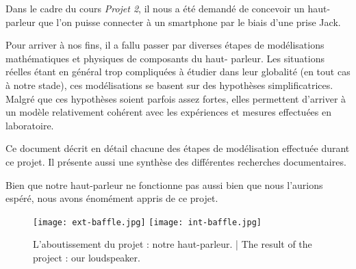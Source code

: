 

\begin{abstract-fr}
Dans le cadre du cours \textit{Projet 2}, il nous a été demandé
de concevoir un haut-parleur que l'on puisse connecter à un smartphone
par le biais d'une prise Jack.

Pour arriver à nos fins, il a fallu passer par diverses étapes
de modélisations mathématiques et physiques de composants du haut-
parleur. Les situations réelles étant en général trop compliquées à étudier
dans leur globalité (en tout cas à notre stade), ces modélisations se basent sur des 
hypothèses simplificatrices. Malgré que ces hypothèses soient parfois assez fortes, 
elles permettent d'arriver à un modèle relativement cohérent avec les expériences et
mesures effectuées en laboratoire.

Ce document décrit en détail chacune des étapes de modélisation effectuée durant
ce projet. Il présente aussi une synthèse des différentes recherches documentaires.

Bien que notre haut-parleur ne fonctionne pas aussi bien que nous l'aurions
espéré, nous avons énomément appris de ce projet.

\begin{figure}[!htb]
	\centering
	\texttt{[image: ext-baffle.jpg]}
	\texttt{[image: int-baffle.jpg]}
	\caption{L'aboutissement du projet : notre haut-parleur. | The result of the project : our loudspeaker.}
\end{figure}

\end{abstract-fr}



